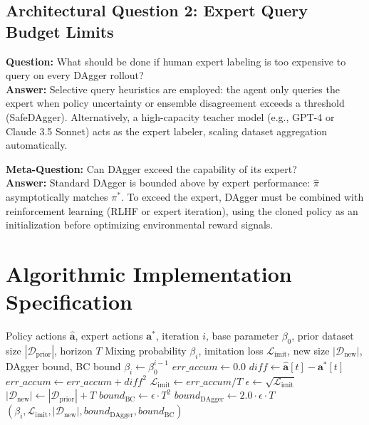 \documentclass[11pt,a4paper]{article}
\theoremstyle{definition}
\begin{document}
\subsection{Architectural Question 2: Expert Query Budget Limits}
\textbf{Question:} What should be done if human expert labeling is too expensive to query on every DAgger rollout?\\
\textbf{Answer:} Selective query heuristics are employed: the agent only queries the expert when policy uncertainty or ensemble disagreement exceeds a threshold (SafeDAgger). Alternatively, a high-capacity teacher model (e.g., GPT-4 or Claude 3.5 Sonnet) acts as the expert labeler, scaling dataset aggregation automatically.

\textbf{Meta-Question:} Can DAgger exceed the capability of its expert?\\
\textbf{Answer:} Standard DAgger is bounded above by expert performance: $\hat{\pi}$ asymptotically matches $\pi^*$. To exceed the expert, DAgger must be combined with reinforcement learning (RLHF or expert iteration), using the cloned policy as an initialization before optimizing environmental reward signals.

\section{Algorithmic Implementation Specification}

\begin{algorithm}[H]
\caption{DAgger Dataset Aggregation and Bound Evaluation}
\begin{algorithmic}[1]
\Require Policy actions $\hat{\mathbf{a}}$, expert actions $\mathbf{a}^*$, iteration $i$, base parameter $\beta_0$, prior dataset size $|\mathcal{D}_{\text{prior}}|$, horizon $T$
\Ensure Mixing probability $\beta_i$, imitation loss $\mathcal{L}_{\text{imit}}$, new size $|\mathcal{D}_{\text{new}}|$, DAgger bound, BC bound
\State $\beta_i \gets \beta_0^{i-1}$
\State $err\_accum \gets 0.0$
    \State $diff \gets \hat{\mathbf{a}}[t] - \mathbf{a}^*[t]$
    \State $err\_accum \gets err\_accum + diff^2$
\EndFor
\State $\mathcal{L}_{\text{imit}} \gets err\_accum / T$
\State $\epsilon \gets \sqrt{\mathcal{L}_{\text{imit}}}$
\State $|\mathcal{D}_{\text{new}}| \gets |\mathcal{D}_{\text{prior}}| + T$
\State $bound_{\text{BC}} \gets \epsilon \cdot T^2$
\State $bound_{\text{DAgger}} \gets 2.0 \cdot \epsilon \cdot T$
\State \Return $(\beta_i, \mathcal{L}_{\text{imit}}, |\mathcal{D}_{\text{new}}|, bound_{\text{DAgger}}, bound_{\text{BC}})$
\end{algorithmic}
\end{algorithm}
\end{document}
